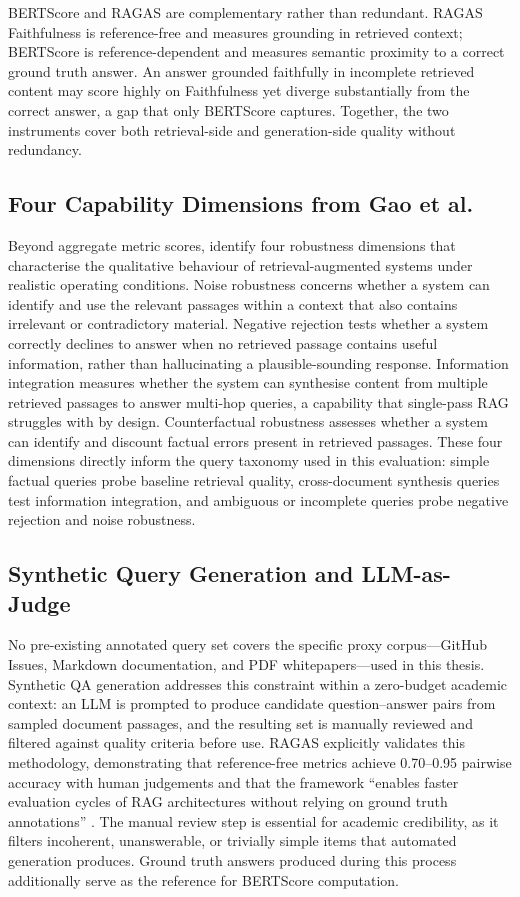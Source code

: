 BERTScore and RAGAS are complementary rather than redundant. RAGAS Faithfulness is reference-free and measures grounding in retrieved context; BERTScore is reference-dependent and measures semantic proximity to a correct ground truth answer. An answer grounded faithfully in incomplete retrieved content may score highly on Faithfulness yet diverge substantially from the correct answer, a gap that only BERTScore captures. Together, the two instruments cover both retrieval-side and generation-side quality without redundancy.

\subsection*{Four Capability Dimensions from Gao et al.}

Beyond aggregate metric scores,  identify four robustness dimensions that characterise the qualitative behaviour of retrieval-augmented systems under realistic operating conditions. Noise robustness concerns whether a system can identify and use the relevant passages within a context that also contains irrelevant or contradictory material. Negative rejection tests whether a system correctly declines to answer when no retrieved passage contains useful information, rather than hallucinating a plausible-sounding response. Information integration measures whether the system can synthesise content from multiple retrieved passages to answer multi-hop queries, a capability that single-pass RAG struggles with by design. Counterfactual robustness assesses whether a system can identify and discount factual errors present in retrieved passages. These four dimensions directly inform the query taxonomy used in this evaluation: simple factual queries probe baseline retrieval quality, cross-document synthesis queries test information integration, and ambiguous or incomplete queries probe negative rejection and noise robustness.

\subsection*{Synthetic Query Generation and LLM-as-Judge}

No pre-existing annotated query set covers the specific proxy corpus—GitHub Issues, Markdown documentation, and PDF whitepapers—used in this thesis. Synthetic QA generation addresses this constraint within a zero-budget academic context: an LLM is prompted to produce candidate question–answer pairs from sampled document passages, and the resulting set is manually reviewed and filtered against quality criteria before use. RAGAS explicitly validates this methodology, demonstrating that reference-free metrics achieve 0.70–0.95 pairwise accuracy with human judgements and that the framework ``enables faster evaluation cycles of RAG architectures without relying on ground truth annotations'' \cite{es2023ragas}. The manual review step is essential for academic credibility, as it filters incoherent, unanswerable, or trivially simple items that automated generation produces. Ground truth answers produced during this process additionally serve as the reference for BERTScore computation.


